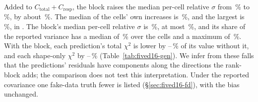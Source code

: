 Added to $C_{\mathrm{total}}+C_{\mathrm{resp}}$, the block raises the median per-cell relative $\sigma$ from \,\% to \,\%, by about \,\%. The median of the cells' own increases is \,\%, and the largest is \,\%, in . The block's median per-cell relative $\sigma$ is \,\%, at most \,\%, and its share of the reported variance has a median of \,\% over the cells and a maximum of \,\%. With the block, each prediction's total $\chi^2$ is lower by --\,\% of its value without it, and each shape-only $\chi^2$ by --\,\% (Table~\ref{tab:fived16-gen}). We infer from these falls that the predictions' residuals have components along the directions the rank- block adds; the comparison does not test this interpretation. Under the reported covariance one fake-data truth fewer is listed (\S\ref{sec:fived16-fd}), with the bias unchanged.
